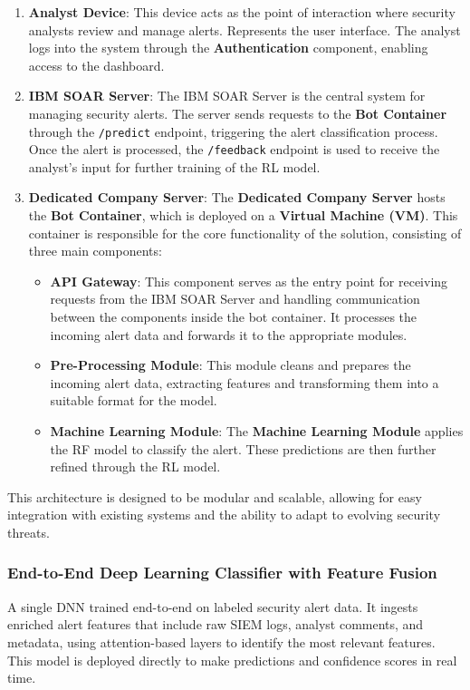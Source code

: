 \begin{enumerate}
    \item \textbf{Analyst Device}: This device acts as the point of interaction where security analysts review and manage alerts. Represents the user interface. The analyst logs into the system through the \textbf{Authentication} component, enabling access to the dashboard.
    
    \item \textbf{IBM SOAR Server}: The IBM SOAR Server is the central system for managing security alerts. The server sends requests to the \textbf{Bot Container} through the \texttt{/predict} endpoint, triggering the alert classification process. Once the alert is processed, the \texttt{/feedback} endpoint is used to receive the analyst's input for further training of the RL model.
    
    \item \textbf{Dedicated Company Server}: The \textbf{Dedicated Company Server} hosts the \textbf{Bot Container}, which is deployed on a \textbf{Virtual Machine (VM)}. This container is responsible for the core functionality of the solution, consisting of three main components:
    \begin{itemize}
        \item \textbf{API Gateway}: This component serves as the entry point for receiving requests from the IBM SOAR Server and handling communication between the components inside the bot container. It processes the incoming alert data and forwards it to the appropriate modules.
        \item \textbf{Pre-Processing Module}: This module cleans and prepares the incoming alert data, extracting features and transforming them into a suitable format for the model.
        \item \textbf{Machine Learning Module}: The \textbf{Machine Learning Module} applies the \gls{RF} model to classify the alert. These predictions are then further refined through the \gls{RL} model.
    \end{itemize}
\end{enumerate}

This architecture is designed to be modular and scalable, allowing for easy integration with existing systems and the ability to adapt to evolving security threats.

\subsubsection{End-to-End Deep Learning Classifier with Feature Fusion}
A single \gls{DNN} trained end-to-end on labeled security alert data. 
It ingests enriched alert features that include raw SIEM logs, analyst comments, and metadata, using attention-based layers to identify the most relevant features. 
This model is deployed directly to make predictions and confidence scores in real time.

